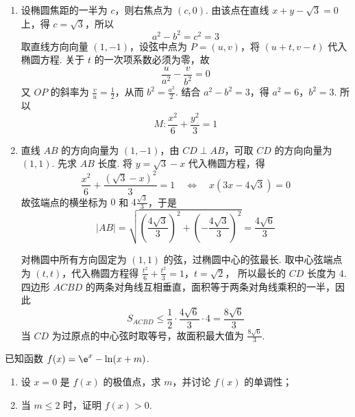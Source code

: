 \begin{solution}
\begin{enumerate}
\item 设椭圆焦距的一半为 \(c\)，则右焦点为 \((c,0)\). 由该点在直线 \(x+y-\sqrt3=0\) 上，得 \(c=\sqrt3\)，所以
\[
a^2-b^2=c^2=3
\]
取直线方向向量 \((1,-1)\)，设弦中点为 \(P=(u,v)\)，将 \((u+t,v-t)\) 代入椭圆方程. 关于 \(t\) 的一次项系数必须为零，故
\[
\frac{u}{a^2}-\frac{v}{b^2}=0
\]
又 \(OP\) 的斜率为 \(\frac{v}{u}=\frac{1}{2}\)，从而 \(b^2=\frac{a^2}{2}\). 结合 \(a^2-b^2=3\)，得 \(a^2=6\)，\(b^2=3\). 所以
\[
M:\frac{x^2}{6}+\frac{y^2}{3}=1
\]

\item 直线 \(AB\) 的方向向量为 \((1,-1)\)，由 \(CD\perp AB\)，可取 \(CD\) 的方向向量为 \((1,1)\). 先求 \(AB\) 长度. 将 \(y=\sqrt3-x\) 代入椭圆方程，得
\[
\frac{x^2}{6}+\frac{(\sqrt3-x)^2}{3}=1
\quad\Longleftrightarrow\quad
x(3x-4\sqrt3)=0
\]
故弦端点的横坐标为 \(0\) 和 \(4\frac{\sqrt3}{3}\)，于是
\[
|AB|=\sqrt{\left(\frac{4\sqrt3}{3}\right)^2+\left(-\frac{4\sqrt3}{3}\right)^2}=\frac{4\sqrt6}{3}
\]

对椭圆中所有方向固定为 \((1,1)\) 的弦，过椭圆中心的弦最长. 取中心弦端点为 \((t,t)\)，代入椭圆方程得
\(\frac{t^2}{6}+\frac{t^2}{3}=1\)，\(t=\sqrt2\)，
所以最长的 \(CD\) 长度为 \(4\). 四边形 \(ACBD\) 的两条对角线互相垂直，面积等于两条对角线乘积的一半，因此
\[
S_{ACBD}\leqslant\frac12\cdot\frac{4\sqrt6}{3}\cdot4=\frac{8\sqrt6}{3}
\]
当 \(CD\) 为过原点的中心弦时取等号，故面积最大值为 \(\frac{8\sqrt6}{3}\).
\end{enumerate}
\end{solution}

\begin{problem}
已知函数 \(f(x) = \e^{x} - \ln(x + m)\).

\begin{enumerate}
\item 设 \(x = 0\) 是 \(f(x)\) 的极值点，求 \(m\)，并讨论 \(f(x)\) 的单调性；
\item 当 \(m \leqslant 2\) 时，证明 \(f(x) > 0\).
\end{enumerate}
\end{problem}


